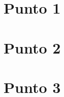 \documentclass{article}
\begin{document}
\section*{Punto 1}


\pagebreak

\section*{Punto 2}


\pagebreak

\section*{Punto 3}

\end{document}
